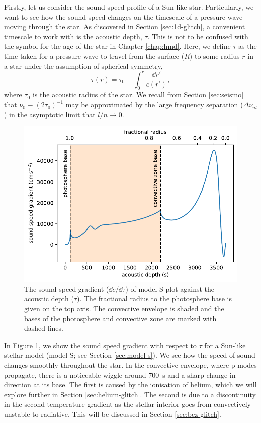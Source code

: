 Firstly, let us consider the sound speed profile of a Sun-like star. Particularly, we want to see how the sound speed changes on the timescale of a pressure wave moving through the star. As discovered in Section \ref{sec:1d-glitch}, a convenient timescale to work with is the acoustic depth, \(\tau\). This is not to be confused with the symbol for the age of the star in Chapter \ref{chap:hmd}. Here, we define \(\tau\) as the time taken for a pressure wave to travel from the surface (\(R\)) to some radius \(r\) in a star under the assumption of spherical symmetry,
%
\begin{equation}
    \tau(r) = \tau_0 - \int_0^{r} \frac{\dd r'}{c(r')},\label{eq:tau}
\end{equation}
%
where \(\tau_0\) is the acoustic radius of the star. We recall from Section \ref{sec:seismo} that \(\nu_0 \equiv (2\tau_0)^{-1}\) may be approximated by the large frequency separation (\(\Delta\nu_{nl}\)) in the asymptotic limit that \(l/n \rightarrow 0\).

\begin{figure}[tb]
    \centering
    \includegraphics{figures/sound-speed-gradient.pdf}
    \caption[The sound speed gradient of model S plot against the acoustic depth.]{The sound speed gradient (\(\dd c/\dd \tau\)) of model S plot against the acoustic depth (\(\tau\)). The fractional radius to the photosphere base is given on the top axis. The convective envelope is shaded and the bases of the photosphere and convective zone are marked with dashed lines.}
    \label{fig:sound-speed-gradient}
\end{figure}

In Figure \ref{fig:sound-speed-gradient}, we show the sound speed gradient with respect to \(\tau\) for a Sun-like stellar model (model S; see Section \ref{sec:model-s}). We see how the speed of sound changes smoothly throughout the star. In the convective envelope, where p-modes propagate, there is a noticeable wiggle around \SI{700}{\second} and a sharp change in direction at its base. The first is caused by the ionisation of helium, which we will explore further in Section \ref{sec:helium-glitch}. The second is due to a discontinuity in the second temperature gradient as the stellar interior goes from convectively unstable to radiative. This will be discussed in Section \ref{sec:bcz-glitch}.

